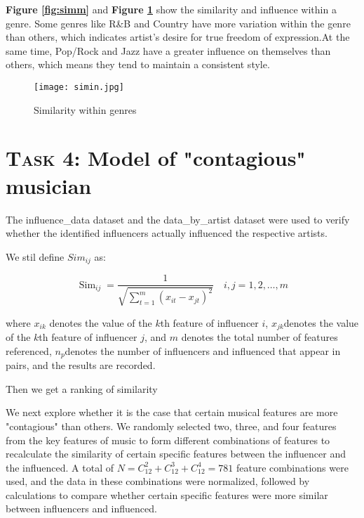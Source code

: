 \documentclass[12pt]{article}  %
\begin{document}
	\textbf{Figure \ref{fig:simm}} and \textbf{Figure \ref{fig:simin}} show the similarity and influence within a genre. Some genres like R\&B and Country have more variation within the genre than others, which indicates artist’s desire for true freedom of expression.At the same time, Pop/Rock and Jazz have a greater influence on themselves than others, which means they tend to maintain a consistent style.
	
	\begin{figure}[htbp]
		\centering
		\texttt{[image: simin.jpg]} 	%
		\caption{Similarity within genres}		%
		\label{fig:simin}							%
	\end{figure}
	
	\section{\textsc{Task 4}: Model of "contagious" musician}
	
	The influence\_data dataset and the data\_by\_artist dataset were used to verify whether the identified influencers actually influenced the respective artists.
	
	We stil define $ Sim_{ij} $ as:
	
	\begin{equation}\label{simij}
		\operatorname{Sim}_{i j}=\frac{1}{\sqrt{\sum_{t=1}^{m}\left(x_{i t}-x_{j t}\right)^{2}}} \quad i, j=1,2, \ldots, m
	\end{equation}
	
	where $ x_{ik} $ denotes the value of the $ k $th feature of influencer $ i $, $ x_{jk} $denotes the value of the $ k $th feature of influencer $ j $, and $ m $ denotes the total number of features referenced, $ n_p $denotes the number of influencers and influenced that appear in pairs, and the results are recorded.
	
	Then we get a ranking of similarity
	
	
	We next explore whether it is the case that certain musical features are more "contagious" than others. We randomly selected two, three, and four features from the key features of music to form different combinations of features to recalculate the similarity of certain specific features between the influencer and the influenced. A total of $ N=C_12^2+C_12^3+C_12^4=781 $ feature combinations were used, and the data in these combinations were normalized, followed by calculations to compare whether certain specific features were more similar between influencers and influenced.
	
\end{document}
